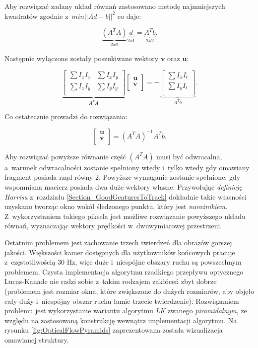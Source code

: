     Aby rozwiązać zadany układ równań zastosowano metodę najmniejszych kwadratów zgodnie z~$min||Ad - b||^{2}$ co daje:

    \[
      \underbrace{(A^{T}A)}_{2x2} \underbrace{d}_{2x1} = \underbrace{A^{T}b}_{2x2}.
    \]

    Następnie wyłączone zostały poszukiwane wektory $\mathbf{v}$ oraz $\mathbf{u}$:

    \[
      \underbrace{
        \begin{bmatrix}
          \sum I_{x} I_{x} & \sum I_{x} I_{y} \\
          \sum I_{x} I_{y} & \sum I_{y} I_{y} \\
        \end{bmatrix}
      }_{A^{T}A}
      \begin{bmatrix}
        \mathbf{u} \\
        \mathbf{v} \\
      \end{bmatrix} =
      -\underbrace{
        \begin{bmatrix}
          \sum I_{x} I_{t} \\
          \sum I_{y} I_{t} \\
        \end{bmatrix}
      }_{A^{T}b}.
    \]

    Co ostatecznie prowadzi do rozwiązania:

    \[
      \begin{bmatrix}
        \mathbf{u} \\
        \mathbf{v} \\
      \end{bmatrix} = (A^{T}A)^{-1} A^{T}b.
    \]

    Aby rozwiązać powyższe równanie część $(A^{T}A)$ musi być odwracalna, a~warunek odwracalności zostanie spełniony wtedy i~tylko wtedy gdy omawiany fragment posiada rząd równy $2$. Powyższe wymaganie zostanie spełnione, gdy wspomniana macierz posiada dwa duże wektory własne. Przywołując \textit{definicję Harrisa} z~rozdziału \ref{Section_GoodGeaturesToTrack} dokładnie takie własności uzyskano tworząc okno wokół śledzonego punktu, który jest \textit{narożnikiem}. Z~wykorzystaniem takiego piksela jest możliwe rozwiązanie powyższego układu równań, wyznaczając wektory prędkości w~dwuwymiarowej przestrzeni.

    Ostatnim problemem jest zachowanie trzech twierdzeń dla obrazów gorszej jakości. Większości kamer dostępnych dla użytkowników końcowych pracuje z~częstotliwością 30 Hz, więc duże i~niespójne obszary ruchu są powszechnym problemem. Czysta implementacja algorytmu rzadkiego przepływu optycznego Lucas-Kanade nie radzi sobie z~takim rodzajem zakłóceń zbyt dobrze (problemem jest rozmiar okna, które zwiększone do dużych rozmiarów, aby objęło cały duży i~niespójny obszar ruchu łamie trzecie twierdzenie). Rozwiązaniem problemu jest wykorzystanie wariantu algorytmu \textit{LK} zwanego \textit{piramidalnym}, ze względu na zastosowaną konstrukcję wewnątrz implementacji algorytmu. Na rysunku \ref{fig:OpticalFlowPyramids} zaprezentowana została wizualizacja omawianej struktury.

